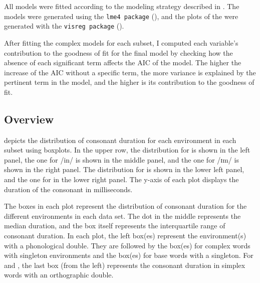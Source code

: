 All models were fitted according to the modeling strategy described in .  
The models were generated using the \texttt{lme4 package} (\citealt{Bates.2014}), and the plots of the  were generated with the \texttt{visreg package} (\citealt{Breheny.2015}). 

After fitting the complex models for each subset, I computed each variable's contribution to the goodness of fit for the final model by checking how the absence of each significant term affects the AIC of the model. The higher the increase of the AIC without a specific term, the more variance is explained by the pertinent term in the model, and the higher is its contribution to the goodness of fit.







\subsection{Overview}
	
 depicts the distribution of consonant duration for each environment in each subset using boxplots. In the upper row, the distribution for  is shown in the left panel, the one for /in/
is shown in the middle panel, and the one for /ɪm/  is shown in the right panel. The distribution for  is shown in the lower left panel, and the one for  in the lower right panel.
The y-axis of each plot displays the duration of the consonant in milliseconds. 

The boxes in each plot represent the distribution of consonant duration for the different environments in each data set. The dot in the middle represents the median duration, and the box itself represents the interquartile range of consonant duration. 
In each plot, the left box(es) represent the environment(s) with a phonological double. They are followed by the box(es) for  complex words with singleton environments and the box(es) for base words with a singleton. For  and , the last box (from the left) represents the consonant duration in simplex words with an orthographic double.




